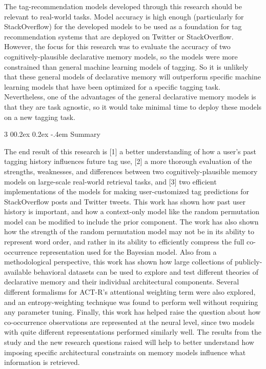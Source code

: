 \documentclass[man,donotrepeattitle]{apa6}
\makeatletter
\renewcommand{\subsubsection}{%
  \@startsection
  {subsubsection}%
  {3}%
  {\parindent}%
  {0\baselineskip \@plus 0.2ex \@minus 0.2ex}%
  {-.4em}%
  {\normalfont\normalsize\bfseries\addperi}}
\makeatother
\begin{document}
The tag-recommendation models developed through this research should be relevant to real-world tasks.
Model accuracy is high enough (particularly for StackOverflow) for the developed models to be used as a foundation for tag recommendation systems that are deployed on Twitter or StackOverflow.
However, the focus for this research was to evaluate the accuracy of two cognitively-plausible declarative memory models, so the models were more constrained than general machine learning models of tagging.
So it is unlikely that these general models of declarative memory will outperform specific machine learning models that have been optimized for a specific tagging task. 
Nevertheless, one of the advantages of the general declarative memory models is that they are task agnostic, so it would take minimal time to deploy these models on a new tagging task.

\subsubsection{Summary}

The end result of this research is [1] a better understanding of how a user's past tagging history influences future tag use,
[2] a more thorough evaluation of the strengths, weaknesses, and differences between two cognitively-plausible memory models on large-scale real-world retrieval tasks,
and [3] two efficient implementations of the models for making user-customized tag predictions for StackOverflow posts and Twitter tweets. 
This work has shown how past user history is important, and how a context-only model like the random permutation model can be modified to include the prior component.
The work has also shown how the strength of the random permutation model may not be in its ability to represent word order,
and rather in its ability to efficiently compress the full co-occurrence representation used for the Bayesian model.
Also from a methodological perspective,
this work has shown how large collections of publicly-available behavioral datasets can be used to explore and test different theories of declarative memory and their individual architectural components.
Several different formalisms for ACT-R's attentional weighting term were also explored, and an entropy-weighting technique was found to perform well without requiring any parameter tuning.
Finally, this work has helped raise the question about how co-occurrence observations are represented at the neural level, since two models with quite different representations performed similarly well.
The results from the study and the new research questions raised will help to better understand how imposing specific architectural constraints on memory models influence what information is retrieved.

\clearpage
\printbibliography[heading=bibintoc]
\end{document}
